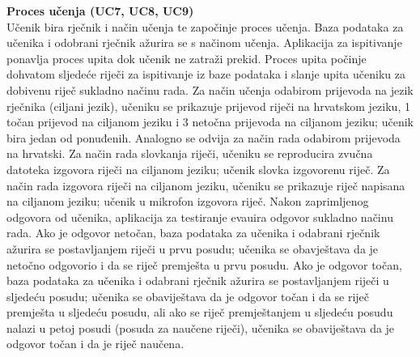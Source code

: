 				\textbf{Proces učenja (UC7, UC8, UC9)}\\
					{Učenik bira rječnik i način učenja te započinje proces učenja. Baza podataka za učenika i odobrani rječnik ažurira se s načinom učenja. Aplikacija za ispitivanje ponavlja proces upita dok učenik ne zatraži prekid. Proces upita počinje dohvatom sljedeće riječi za ispitivanje iz baze podataka i slanje upita učeniku za dobivenu riječ sukladno načinu rada. Za način učenja odabirom prijevoda na jezik rječnika (ciljani jezik), učeniku se prikazuje prijevod riječi na hrvatskom jeziku, 1 točan prijevod na ciljanom jeziku i 3 netočna prijevoda na ciljanom jeziku; učenik bira jedan od ponuđenih. Analogno se odvija za način rada odabirom prijevoda na hrvatski. Za način rada slovkanja riječi, učeniku se reproducira zvučna datoteka izgovora riječi na ciljanom jeziku; učenik slovka izgovorenu riječ. Za način rada izgovora riječi na ciljanom jeziku, učeniku se prikazuje riječ napisana na ciljanom jeziku; učenik u mikrofon izgovora riječ. Nakon zaprimljenog odgovora od učenika, aplikacija za testiranje evauira odgovor sukladno načinu rada. Ako je odgovor netočan, baza podataka za učenika i odabrani rječnik ažurira se postavljanjem riječi u prvu posudu; učenika se obavještava da je netočno odgovorio i da se riječ premješta u prvu posudu. Ako je odgovor točan, baza podataka za učenika i odabrani rječnik ažurira se postavljanjem riječi u sljedeću posudu; učenika se obaviještava da je odgovor točan i da se riječ premješta u sljedeću posudu, ali ako se riječ premještanjem u sljedeću posudu nalazi u petoj posudi (posuda za naučene riječi), učenika se obaviještava da je odgovor točan i da je riječ naučena.}
				
